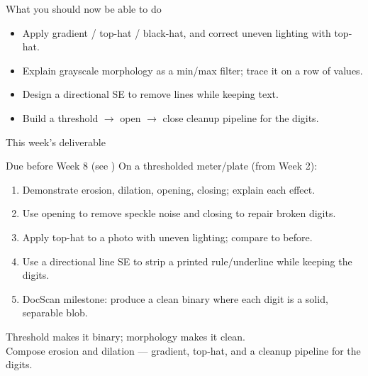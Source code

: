 \documentclass[10pt,aspectratio=169]{beamer}
\begin{document}
\begin{frame}{What you should now be able to do}
  \begin{itemize}
    \item Apply gradient / top-hat / black-hat, and correct uneven lighting with top-hat.
    \item Explain grayscale morphology as a min/max filter; trace it on a row of values.
    \item Design a directional SE to remove lines while keeping text.
    \item Build a threshold $\rightarrow$ open $\rightarrow$ close cleanup pipeline for the digits.
  \end{itemize}
\end{frame}

\begin{frame}{This week's deliverable}
  \begin{alertblock}{Due before Week 8 (see )}
    On a thresholded meter/plate (from Week 2):
    \begin{enumerate}
      \item Demonstrate erosion, dilation, opening, closing; explain each effect.
      \item Use opening to remove speckle noise and closing to repair broken digits.
      \item Apply top-hat to a photo with uneven lighting; compare to before.
      \item Use a directional line SE to strip a printed rule/underline while keeping the digits.
      \item DocScan milestone: produce a clean binary where each digit is a solid, separable blob.
    \end{enumerate}
  \end{alertblock}
\end{frame}

\begin{frame}[standout]
  Threshold makes it binary; morphology makes it clean.\\[4pt]
  \normalsize Compose erosion and dilation — gradient, top-hat, and a cleanup pipeline for the digits.
\end{frame}
\end{document}
